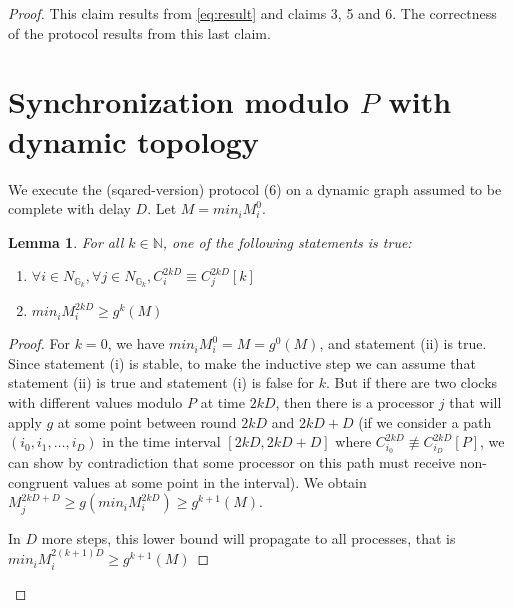\documentclass[11pt,letterpaper]{article}
\newtheorem{lem}[thm]{Lemma}
\begin{document}
\begin{proof}
	This claim results from \eqref{eq:result} and claims 3, 5 and 6.
	The correctness of the protocol results from this last claim.


\section{Synchronization modulo $P$ with dynamic topology}

	We execute the (sqared-version) protocol (6) on a dynamic graph
	assumed to be complete with delay $D$. Let $M = min_i M_i^0$.

\begin{lem} \label{lem:croissant2}
	For all $k \in \mathds{N}$, one of the following statements is true:
	\begin{enumerate}
		\item $\forall i \in N_{\mathds{G}_k}, \forall j \in N_{\mathds{G}_k}, C_i^{2kD} \equiv C_j^{2kD} [k]$
		\item $min_i M_i^{2kD} \geq g^k(M)$
	\end{enumerate}
\end{lem}
\begin{proof}
	For $k=0$, we have $min_i M_i^0 = M = g^0(M)$, and
	statement (ii) is true. Since statement (i) is stable, to make
	the inductive step we can assume that statement (ii) is true
	and statement (i) is false for $k$.
	But if there are two clocks
	with different values modulo $P$ at time $2kD$, then 
	there is a processor $j$ that
	will apply $g$ at some point between round $2kD$ and $2kD+D$
	(if we consider a path $(i_0, i_1, \dots, i_D)$ in the time interval $[2kD, 2kD+D]$ where $C_{i_0}^{2kD} \not\equiv C_{i_D}^{2kD} [P]$,
	we can show by contradiction that some processor on this path must receive non-congruent values
	at some point in the interval).
	We obtain
	$M_j^{2kD+D} \geq g(min_i M_i^{2kD}) \geq g^{k+1}(M)$.

	In $D$ more steps, this lower bound will propagate to all processes, that is
	$min_i M_i^{2(k+1)D} \geq g^{k+1}(M)$
\end{proof}


\end{proof}
\end{document}

